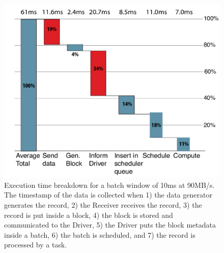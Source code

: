 \begin{figure}[t!]
  \begin{center}
    \includegraphics[scale=0.40]{images_graphs/waterfall/Rplots_illustrator.pdf}
  \end{center}
  \caption{Execution time breakdown for a batch window of 10ms at 90MB/s. The timestamp of the data is collected when 1) the data generator generates the record, 2) the Receiver receives the record, 3) the record is put inside a block, 4) the block is stored and communicated to the Driver, 5) the Driver puts the block metadata inside a batch, 6) the batch is scheduled, and 7) the record is processed by a task.}
  \label{fig:SparkStreaming_time_breakdown}
\end{figure}

